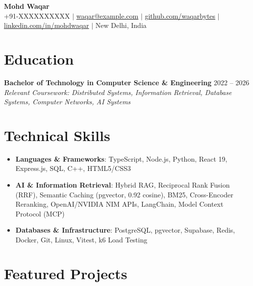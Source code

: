 \documentclass[10pt,letterpaper]{article}
\begin{document}
\begin{center}
    {\Huge \textbf{Mohd Waqar}} \\ \vspace{2pt}
    \small +91-XXXXXXXXXX $|$ \href{mailto:waqar@example.com}{waqar@example.com} $|$ \href{https://github.com/waqarbytes}{github.com/waqarbytes} $|$ \href{https://linkedin.com/in/mohdwaqar}{linkedin.com/in/mohdwaqar} $|$ New Delhi, India
\end{center}

\vspace{-6pt}

\section{Education}
\textbf{Bachelor of Technology in Computer Science \& Engineering} \hfill 2022 -- 2026 \\
\textit{Relevant Coursework: Distributed Systems, Information Retrieval, Database Systems, Computer Networks, AI Systems}

\vspace{-4pt}

\section{Technical Skills}
\begin{itemize}
    \item \textbf{Languages \& Frameworks}: TypeScript, Node.js, Python, React 19, Express.js, SQL, C++, HTML5/CSS3
    \item \textbf{AI \& Information Retrieval}: Hybrid RAG, Reciprocal Rank Fusion (RRF), Semantic Caching (pgvector, 0.92 cosine), BM25, Cross-Encoder Reranking, OpenAI/NVIDIA NIM APIs, LangChain, Model Context Protocol (MCP)
    \item \textbf{Databases \& Infrastructure}: PostgreSQL, pgvector, Supabase, Redis, Docker, Git, Linux, Vitest, k6 Load Testing
\end{itemize}

\vspace{-4pt}

\section{Featured Projects}
\end{document}
